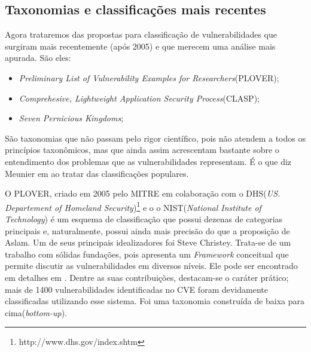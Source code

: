 		\subsection{Taxonomias e classificações mais recentes}
		\label{subsec:prop_taxonomicas_recentes}
			Agora trataremos das propostas para classificação de vulnerabilidades que surgiram
			mais recentemente (após 2005) e que merecem uma análise mais apurada. São eles:
			\begin{itemize}
				\item{\textsl{Preliminary List of Vulnerability Examples for Researchers}(PLOVER);}
				\item{\textsl{Comprehesive, Lightweight Application Security Process}(CLASP);}
				\item{\textsl{Seven Pernicious Kingdoms};}
			\end{itemize}
			São taxonomias que não passam pelo rigor científico, pois não atendem a todos
			os princípios taxonômicos, mas que ainda assim acrescentam bastante sobre o
			entendimento dos problemas que as vulnerabilidades representam. É o que
			diz Meunier em \cite{Meunier2006} ao tratar das classificações populares.


			O PLOVER, criado em 2005 pelo MITRE em colaboração com o 
			DHS(\textsl{US. Departement	of Homeland Security})\footnote{http://www.dhs.gov/index.shtm} e o
			o NIST(\textsl{National Institute of Technology}) é um esquema de classificação
			que possui dezenas de categorias principais e, naturalmente, possui ainda mais precisão
			do que a proposição de Aslam. Um de seus principais idealizadores foi Steve Christey.
			Trata-se de um trabalho com sólidas fundações, pois
			apresenta um \textsl{Framework} conceitual que permite discutir as vulnerabilidades
			em diversos níveis. Ele pode ser encontrado em detalhes em \cite{Christey2006}.
			Dentre as suas contribuições, destacam-se o caráter prático; mais de 1400 vulnerabilidades
			identificadas no CVE foram devidamente classificadas utilizando esse sistema.
			Foi uma taxonomia construída de baixa para cima(\textsl{bottom-up}).

			

